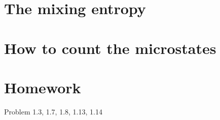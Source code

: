 \documentclass[twoside]{article}
\begin{document}
\section{The mixing entropy}

\section{How to count the microstates}

\section{Homework}
Problem 1.3, 1.7, 1.8, 1.13, 1.14
\end{document}
